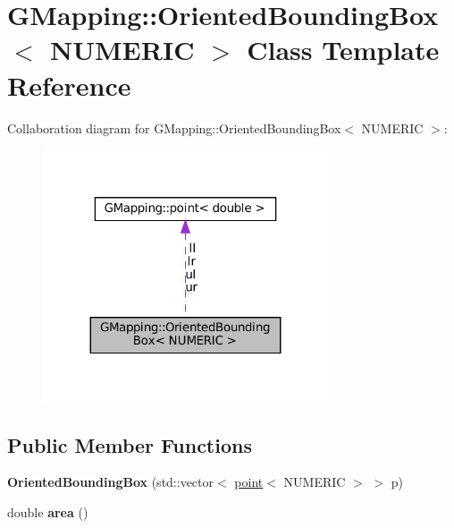 \hypertarget{classGMapping_1_1OrientedBoundingBox}{}\section{G\+Mapping\+:\+:Oriented\+Bounding\+Box$<$ N\+U\+M\+E\+R\+IC $>$ Class Template Reference}
\label{classGMapping_1_1OrientedBoundingBox}


Collaboration diagram for G\+Mapping\+:\+:Oriented\+Bounding\+Box$<$ N\+U\+M\+E\+R\+IC $>$\+:
\nopagebreak
\begin{figure}[H]
\begin{center}
\leavevmode
\includegraphics[width=239pt]{classGMapping_1_1OrientedBoundingBox__coll__graph}
\end{center}
\end{figure}
\subsection*{Public Member Functions}
\begin{DoxyCompactItemize}
\item 
\mbox{\label{classGMapping_1_1OrientedBoundingBox_a5f0424e475717fadd80fcbeab56ab252}} 
{\bfseries Oriented\+Bounding\+Box} (std\+::vector$<$ \hyperlink{structGMapping_1_1point}{point}$<$ N\+U\+M\+E\+R\+IC $>$ $>$ p)
\item 
\mbox{\label{classGMapping_1_1OrientedBoundingBox_ad81b252f062bc3416eab55627e06cf13}} 
double {\bfseries area} ()
\end{DoxyCompactItemize}

